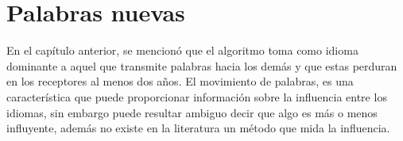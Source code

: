 \chapter{Palabras nuevas}



En el capítulo anterior, se mencionó que el algoritmo toma como  idioma
dominante a aquel que transmite palabras hacia los demás y que estas perduran en los receptores al menos dos años.  El movimiento de palabras, es una característica que puede proporcionar información sobre la influencia entre los idiomas, sin embargo  puede resultar ambiguo decir que algo es más o menos influyente, además  no existe en la literatura un método que mida la influencia.






% 
% 



 


 

